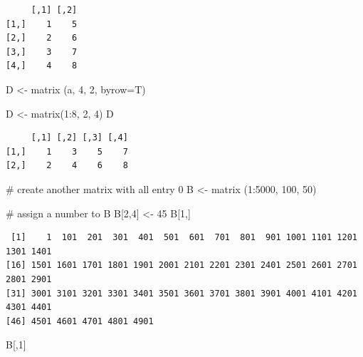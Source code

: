\documentclass[
  letterpaper,
]{scrbook}
\newenvironment{Shaded}{\begin{snugshade}}{\end{snugshade}}
\newcommand{\AttributeTok}[1]{\textcolor[rgb]{0.40,0.45,0.13}{#1}}
\newcommand{\CommentTok}[1]{\textcolor[rgb]{0.37,0.37,0.37}{#1}}
\newcommand{\DecValTok}[1]{\textcolor[rgb]{0.68,0.00,0.00}{#1}}
\newcommand{\FunctionTok}[1]{\textcolor[rgb]{0.28,0.35,0.67}{#1}}
\newcommand{\NormalTok}[1]{\textcolor[rgb]{0.00,0.23,0.31}{#1}}
\newcommand{\OtherTok}[1]{\textcolor[rgb]{0.00,0.23,0.31}{#1}}
\newcommand{\SpecialCharTok}[1]{\textcolor[rgb]{0.37,0.37,0.37}{#1}}
\begin{document}
\begin{verbatim}
     [,1] [,2]
[1,]    1    5
[2,]    2    6
[3,]    3    7
[4,]    4    8
\end{verbatim}

\begin{Shaded}
\begin{Highlighting}[]
\NormalTok{D }\OtherTok{\textless{}{-}} \FunctionTok{matrix}\NormalTok{ (a, }\DecValTok{4}\NormalTok{, }\DecValTok{2}\NormalTok{, }\AttributeTok{byrow=}\NormalTok{T)}

\NormalTok{D }\OtherTok{\textless{}{-}} \FunctionTok{matrix}\NormalTok{(}\DecValTok{1}\SpecialCharTok{:}\DecValTok{8}\NormalTok{, }\DecValTok{2}\NormalTok{, }\DecValTok{4}\NormalTok{)}
\NormalTok{D}
\end{Highlighting}
\end{Shaded}

\begin{verbatim}
     [,1] [,2] [,3] [,4]
[1,]    1    3    5    7
[2,]    2    4    6    8
\end{verbatim}

\begin{Shaded}
\begin{Highlighting}[]
\CommentTok{\# create another matrix with all entry 0}
\NormalTok{B }\OtherTok{\textless{}{-}} \FunctionTok{matrix}\NormalTok{ (}\DecValTok{1}\SpecialCharTok{:}\DecValTok{5000}\NormalTok{, }\DecValTok{100}\NormalTok{, }\DecValTok{50}\NormalTok{)}

\CommentTok{\# assign a number to B}
\NormalTok{B[}\DecValTok{2}\NormalTok{,}\DecValTok{4}\NormalTok{] }\OtherTok{\textless{}{-}} \DecValTok{45}
\NormalTok{B[}\DecValTok{1}\NormalTok{,]}
\end{Highlighting}
\end{Shaded}

\begin{verbatim}
 [1]    1  101  201  301  401  501  601  701  801  901 1001 1101 1201 1301 1401
[16] 1501 1601 1701 1801 1901 2001 2101 2201 2301 2401 2501 2601 2701 2801 2901
[31] 3001 3101 3201 3301 3401 3501 3601 3701 3801 3901 4001 4101 4201 4301 4401
[46] 4501 4601 4701 4801 4901
\end{verbatim}

\begin{Shaded}
\begin{Highlighting}[]
\NormalTok{B[,}\DecValTok{1}\NormalTok{]}
\end{Highlighting}
\end{Shaded}
\end{document}
